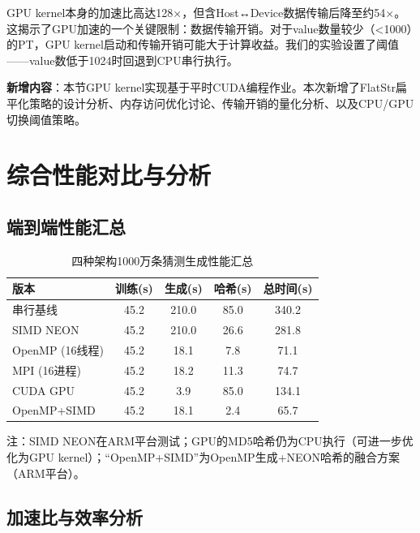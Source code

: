 \documentclass[12pt,a4paper]{ctexart}
\begin{document}
GPU kernel本身的加速比高达128×，但含Host↔Device数据传输后降至约54×。这揭示了GPU加速的一个关键限制：数据传输开销。对于value数量较少（<1000）的PT，GPU kernel启动和传输开销可能大于计算收益。我们的实验设置了阈值——value数低于1024时回退到CPU串行执行。

\textbf{新增内容}：本节GPU kernel实现基于平时CUDA编程作业。本次新增了FlatStr扁平化策略的设计分析、内存访问优化讨论、传输开销的量化分析、以及CPU/GPU切换阈值策略。

\section{综合性能对比与分析}

\subsection{端到端性能汇总}

\begin{table}[ht]
\centering
\caption{四种架构1000万条猜测生成性能汇总}
\label{tab:summary}
\begin{tabular}{@{}p{2.8cm}cccc@{}}
\toprule
\textbf{版本} & \textbf{训练(s)} & \textbf{生成(s)} & \textbf{哈希(s)} & \textbf{总时间(s)} \\
\midrule
串行基线        & 45.2 & 210.0 & 85.0  & 340.2 \\
SIMD NEON       & 45.2 & 210.0 & 26.6  & 281.8 \\
OpenMP (16线程) & 45.2 & 18.1  & 7.8   & 71.1  \\
MPI (16进程)    & 45.2 & 18.2  & 11.3  & 74.7  \\
CUDA GPU        & 45.2 & 3.9   & 85.0  & 134.1 \\
OpenMP+SIMD     & 45.2 & 18.1  & 2.4   & 65.7  \\
\bottomrule
\end{tabular}
\end{table}

注：SIMD NEON在ARM平台测试；GPU的MD5哈希仍为CPU执行（可进一步优化为GPU kernel）；``OpenMP+SIMD''为OpenMP生成+NEON哈希的融合方案（ARM平台）。

\subsection{加速比与效率分析}
\end{document}
